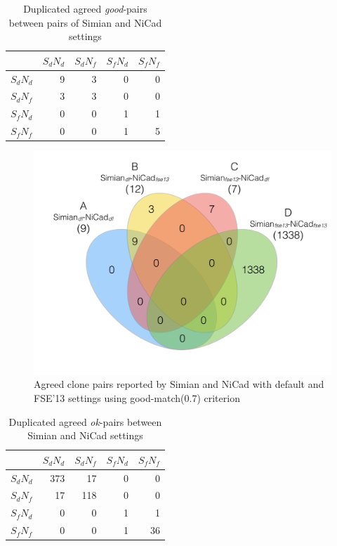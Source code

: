 \documentclass{IEEEtran}
\begin{document}
\begin{table}[H]
	\centering
	\caption{Duplicated agreed \textit{good}-pairs between pairs of Simian and NiCad settings}
	\label{t_dup_agreed_good_clone_pairs}
	\begin{tabular}{l|r|r|r|r}
		\hline
		& $S_dN_d$ & $S_dN_f$ & $S_fN_d$ & $S_fN_f$ \\ %
		\hline
		$S_dN_d$ & 9 & 3 & 0 & 0 \\%
		$S_dN_f$ & 3 & 3 & 0 & 0 \\ %
		$S_fN_d$ & 0 & 0 & 1 & 1 \\
		$S_fN_f$ & 0 & 0 & 1 & 5 \\	
		\hline
	\end{tabular}
\end{table}


\begin{figure}[H]
	\centering
	\includegraphics[width=0.5\linewidth]{venn4_pairs_good}
	\caption[Agreed clone pairs reported by Simian and NiCad with default and FSE'13 settings using good-match(0.7) criterion]{Agreed clone pairs reported by Simian and NiCad with default and FSE'13 settings using good-match(0.7) criterion}
	\label{fig:venn4_pairs}
\end{figure}

\begin{table}[h]
	\centering
	\caption{Duplicated agreed \textit{ok}-pairs between Simian and NiCad settings}
	\label{t_dup_agreed_ok_clone_pairs}
	\begin{tabular}{l|r|r|r|r}
		\hline
		& $S_dN_d$ & $S_dN_f$ & $S_fN_d$ & $S_fN_f$ \\ %
		\hline
		$S_dN_d$ & 373 & 17 & 0 & 0 \\%
		$S_dN_f$ & 17 & 118 & 0 & 0 \\ %
		$S_fN_d$ & 0 & 0 & 1 & 1 \\
		$S_fN_f$ & 0 & 0 & 1 & 36 \\	
		\hline
	\end{tabular}
\end{table}
\end{document}
